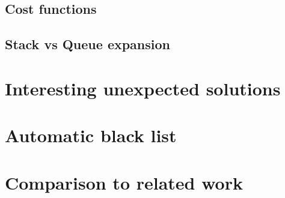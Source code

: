 \subsection{Cost functions}
\subsection{Stack vs Queue expansion}

\section{Interesting unexpected solutions}
\section{Automatic black list}\label{Automatic black list}

\section{Comparison to related work}








